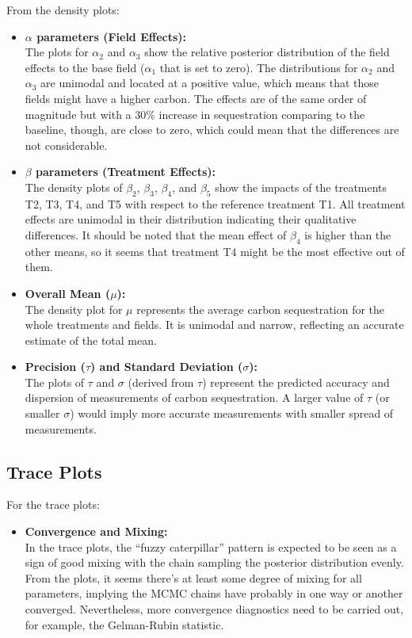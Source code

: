 \documentclass[
]{article}
\providecommand{\tightlist}{%
  \setlength{\itemsep}{0pt}\setlength{\parskip}{0pt}}
\begin{document}
From the density plots:

\begin{itemize}
\item
  \textbf{\(\alpha\) parameters (Field Effects):}\\
  The plots for \(\alpha_2\) and \(\alpha_3\) show the relative
  posterior distribution of the field effects to the base field
  (\(\alpha_1\) that is set to zero). The distributions for \(\alpha_2\)
  and \(\alpha_3\) are unimodal and located at a positive value, which
  means that those fields might have a higher carbon. The effects are of
  the same order of magnitude but with a 30\% increase in sequestration
  comparing to the baseline, though, are close to zero, which could mean
  that the differences are not considerable.
\item
  \textbf{\(\beta\) parameters (Treatment Effects):}\\
  The density plots of \(\beta_2\), \(\beta_3\), \(\beta_4\), and
  \(\beta_5\) show the impacts of the treatments T2, T3, T4, and T5 with
  respect to the reference treatment T1. All treatment effects are
  unimodal in their distribution indicating their qualitative
  differences. It should be noted that the mean effect of \(\beta_4\) is
  higher than the other means, so it seems that treatment T4 might be
  the most effective out of them.
\item
  \textbf{Overall Mean (\(\mu\)):}\\
  The density plot for \(\mu\) represents the average carbon
  sequestration for the whole treatments and fields. It is unimodal and
  narrow, reflecting an accurate estimate of the total mean.
\item
  \textbf{Precision (\(\tau\)) and Standard Deviation (\(\sigma\)):}\\
  The plots of \(\tau\) and \(\sigma\) (derived from \(\tau\)) represent
  the predicted accuracy and dispersion of measurements of carbon
  sequestration. A larger value of \(\tau\) (or smaller \(\sigma\))
  would imply more accurate measurements with smaller spread of
  measurements.
\end{itemize}

\subsection{Trace Plots}\label{trace-plots}

For the trace plots:

\begin{itemize}
\tightlist
\item
  \textbf{Convergence and Mixing:}\\
  In the trace plots, the ``fuzzy caterpillar'' pattern is expected to
  be seen as a sign of good mixing with the chain sampling the posterior
  distribution evenly. From the plots, it seems there's at least some
  degree of mixing for all parameters, implying the MCMC chains have
  probably in one way or another converged. Nevertheless, more
  convergence diagnostics need to be carried out, for example, the
  Gelman-Rubin statistic.
\end{itemize}
\end{document}
